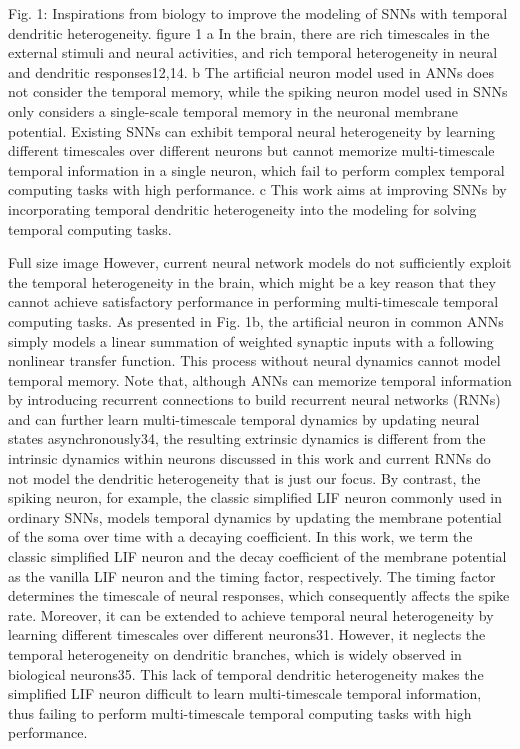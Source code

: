 Fig. 1: Inspirations from biology to improve the modeling of SNNs with temporal dendritic heterogeneity.
figure 1
a In the brain, there are rich timescales in the external stimuli and neural activities, and rich temporal heterogeneity in neural and dendritic responses12,14. b The artificial neuron model used in ANNs does not consider the temporal memory, while the spiking neuron model used in SNNs only considers a single-scale temporal memory in the neuronal membrane potential. Existing SNNs can exhibit temporal neural heterogeneity by learning different timescales over different neurons but cannot memorize multi-timescale temporal information in a single neuron, which fail to perform complex temporal computing tasks with high performance. c This work aims at improving SNNs by incorporating temporal dendritic heterogeneity into the modeling for solving temporal computing tasks.

Full size image
However, current neural network models do not sufficiently exploit the temporal heterogeneity in the brain, which might be a key reason that they cannot achieve satisfactory performance in performing multi-timescale temporal computing tasks. As presented in Fig. 1b, the artificial neuron in common ANNs simply models a linear summation of weighted synaptic inputs with a following nonlinear transfer function. This process without neural dynamics cannot model temporal memory. Note that, although ANNs can memorize temporal information by introducing recurrent connections to build recurrent neural networks (RNNs) and can further learn multi-timescale temporal dynamics by updating neural states asynchronously34, the resulting extrinsic dynamics is different from the intrinsic dynamics within neurons discussed in this work and current RNNs do not model the dendritic heterogeneity that is just our focus. By contrast, the spiking neuron, for example, the classic simplified LIF neuron commonly used in ordinary SNNs, models temporal dynamics by updating the membrane potential of the soma over time with a decaying coefficient. In this work, we term the classic simplified LIF neuron and the decay coefficient of the membrane potential as the vanilla LIF neuron and the timing factor, respectively. The timing factor determines the timescale of neural responses, which consequently affects the spike rate. Moreover, it can be extended to achieve temporal neural heterogeneity by learning different timescales over different neurons31. However, it neglects the temporal heterogeneity on dendritic branches, which is widely observed in biological neurons35. This lack of temporal dendritic heterogeneity makes the simplified LIF neuron difficult to learn multi-timescale temporal information, thus failing to perform multi-timescale temporal computing tasks with high performance.

